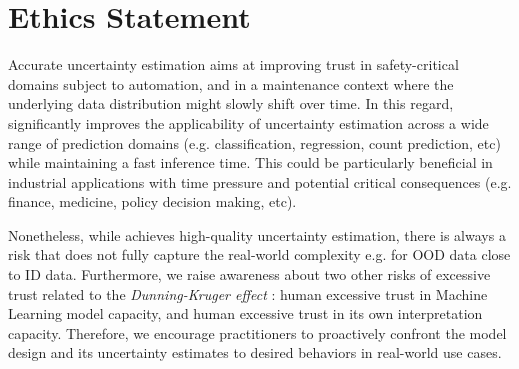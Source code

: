 \section{Ethics Statement} \label{sec:broader-impact}

Accurate uncertainty estimation aims at improving trust in safety-critical domains subject to automation, and in a maintenance context where the underlying data distribution might slowly shift over time. In this regard, \oursacro{} significantly improves the applicability of uncertainty estimation across a wide range of prediction domains (e.g. classification, regression, count prediction, etc) while maintaining a fast inference time. This could be particularly beneficial in industrial applications with time pressure and potential critical consequences (e.g. finance, medicine, policy decision making, etc).

Nonetheless, while \oursacro{} achieves high-quality uncertainty estimation, there is always a risk that \oursacro{} does not fully capture the real-world complexity e.g. for OOD data close to ID data. Furthermore, we raise awareness about two other risks of excessive trust related to the \emph{Dunning-Kruger effect} \citep{dunning-kruger}: human excessive trust in Machine Learning model capacity, and human excessive trust in its own interpretation capacity. Therefore, we encourage practitioners to proactively confront the model design and its uncertainty estimates to desired behaviors in real-world use cases.